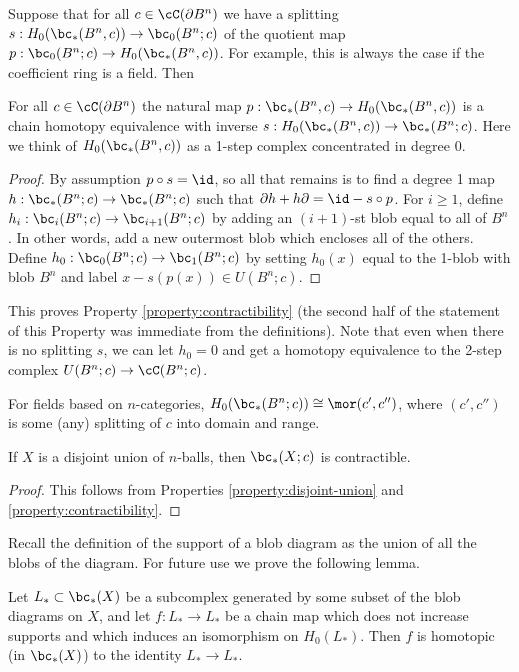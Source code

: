Suppose that for all $c \in \cC(\bd B^n)$
we have a splitting $s: H_0(\bc_*(B^n, c)) \to \bc_0(B^n; c)$
of the quotient map
$p: \bc_0(B^n; c) \to H_0(\bc_*(B^n, c))$.
For example, this is always the case if the coefficient ring is a field.
Then
\begin{prop} \label{bcontract}
For all $c \in \cC(\bd B^n)$ the natural map $p: \bc_*(B^n, c) \to H_0(\bc_*(B^n, c))$
is a chain homotopy equivalence
with inverse $s: H_0(\bc_*(B^n, c)) \to \bc_*(B^n; c)$.
Here we think of $H_0(\bc_*(B^n, c))$ as a 1-step complex concentrated in degree 0.
\end{prop}
\begin{proof}
By assumption $p\circ s = \id$, so all that remains is to find a degree 1 map
$h : \bc_*(B^n; c) \to \bc_*(B^n; c)$ such that $\bd h + h\bd = \id - s \circ p$.
For $i \ge 1$, define $h_i : \bc_i(B^n; c) \to \bc_{i+1}(B^n; c)$ by adding
an $(i{+}1)$-st blob equal to all of $B^n$.
In other words, add a new outermost blob which encloses all of the others.
Define $h_0 : \bc_0(B^n; c) \to \bc_1(B^n; c)$ by setting $h_0(x)$ equal to
the 1-blob with blob $B^n$ and label $x - s(p(x)) \in U(B^n; c)$.
\end{proof}
This proves Property \ref{property:contractibility} (the second half of the 
statement of this Property was immediate from the definitions).
Note that even when there is no splitting $s$, we can let $h_0 = 0$ and get a homotopy
equivalence to the 2-step complex $U(B^n; c) \to \cC(B^n; c)$.

For fields based on $n$-categories, $H_0(\bc_*(B^n; c)) \cong \mor(c', c'')$,
where $(c', c'')$ is some (any) splitting of $c$ into domain and range.

\begin{cor} \label{disj-union-contract}
If $X$ is a disjoint union of $n$-balls, then $\bc_*(X; c)$ is contractible.
\end{cor}

\begin{proof}
This follows from Properties \ref{property:disjoint-union} and \ref{property:contractibility}.
\end{proof}

Recall the definition of the support of a blob diagram as the union of all the 
blobs of the diagram.
For future use we prove the following lemma.

\begin{lemma} \label{support-shrink}
Let $L_* \sub \bc_*(X)$ be a subcomplex generated by some
subset of the blob diagrams on $X$, and let $f: L_* \to L_*$
be a chain map which does not increase supports and which induces an isomorphism on
$H_0(L_*)$.
Then $f$ is homotopic (in $\bc_*(X)$) to the identity $L_*\to L_*$.
\end{lemma}

